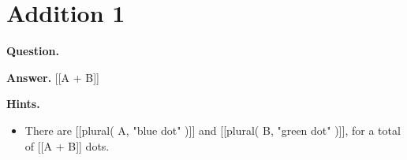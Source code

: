 \documentclass{article}
\begin{document}
\section*{Addition 1}
\textbf{Question.} 

\textbf{Answer.} [[A + B]]

\textbf{Hints.}
\begin{itemize}
  \item There are [[plural( A, "blue dot" )]] and [[plural( B, "green dot" )]], for a total of [[A + B]] dots.
\end{itemize}
\end{document}
